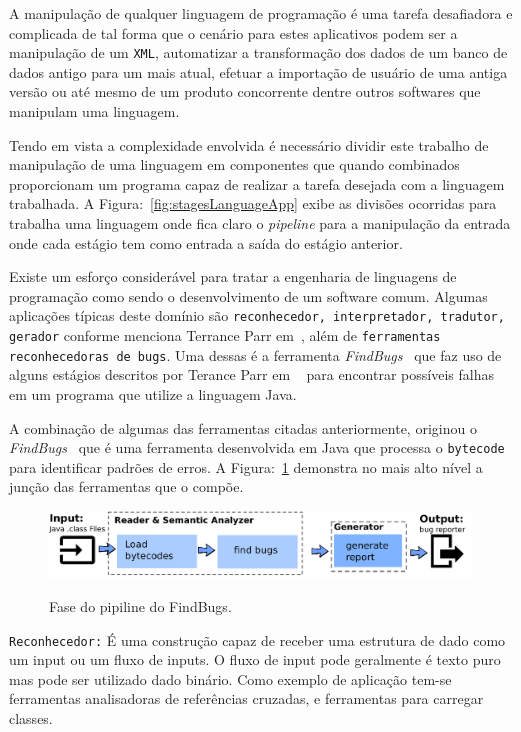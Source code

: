 A manipulação de qualquer linguagem de programação é uma tarefa desafiadora e complicada de tal forma que o cenário para estes aplicativos podem ser a manipulação de um \texttt{XML}, automatizar a transformação dos dados de um banco de dados antigo para um mais atual, efetuar a importação de usuário de uma antiga versão ou até mesmo de um produto concorrente dentre outros softwares que manipulam uma linguagem.

Tendo em vista a complexidade envolvida é necessário dividir este trabalho de manipulação de uma linguagem em componentes que quando combinados proporcionam um programa capaz de realizar a tarefa desejada com a linguagem trabalhada. A Figura:~\ref{fig:stagesLanguageApp} exibe as divisões ocorridas para trabalha uma linguagem onde fica claro o \textit{pipeline} para a manipulação da entrada onde cada estágio tem como entrada a saída do estágio anterior.

Existe um esforço considerável para tratar a engenharia de linguagens de programação como sendo o desenvolvimento de um software comum. Algumas aplicações típicas deste domínio são \texttt{reconhecedor, interpretador, tradutor, gerador} conforme menciona Terrance Parr em~\cite{Parr:2009:LIP:1823613},  além de \texttt{ferramentas reconhecedoras de bugs}. Uma dessas é a ferramenta \textit{FindBugs}~\cite{FindBugs} que faz uso de alguns estágios descritos por Terance Parr em ~\cite{Parr:2009:LIP:1823613} para encontrar possíveis falhas em um programa que utilize a linguagem Java.

A combinação de algumas das ferramentas citadas anteriormente, originou o \textit{FindBugs}~\cite{FindBugs} que é uma ferramenta desenvolvida em Java que processa o \texttt{bytecode} para identificar padrões de erros. A Figura:~\ref{fig:findBugs} demonstra no mais alto nível a junção das ferramentas que o compõe. 

\begin{figure}[h]
	\center
	\includegraphics[scale=0.9]{Imagens/pipelineFindbugs}
	\label{fig:findBugs}
	\caption{Fase do pipiline do FindBugs.}
\end{figure}

\texttt{Reconhecedor:} É uma construção capaz de receber uma estrutura de dado como um input ou um fluxo de inputs. O fluxo de input pode geralmente é texto puro mas pode ser utilizado dado binário. Como exemplo de aplicação tem-se ferramentas analisadoras de referências cruzadas, e ferramentas para carregar classes.

